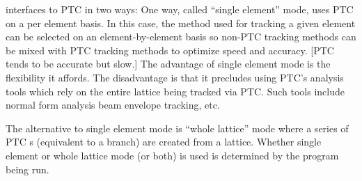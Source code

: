 \bmad interfaces to PTC in two ways: One way, called ``single element'' mode, uses PTC on a per
element basis. In this case, the method used for tracking a given element can be selected on an
element-by-element basis so non-PTC tracking methods can be mixed with PTC tracking methods to
optimize speed and accuracy. [PTC tends to be accurate but slow.] The advantage of single element
mode is the flexibility it affords. The disadvantage is that it precludes using PTC's analysis tools
which rely on the entire lattice being tracked via PTC. Such tools include normal form analysis beam
envelope tracking, etc.

The alternative to single element mode is ``whole lattice'' mode where a series of PTC s
(equivalent to a \bmad branch) are created from a \bmad lattice. Whether single element or whole
lattice mode (or both) is used is determined by the program being run.

